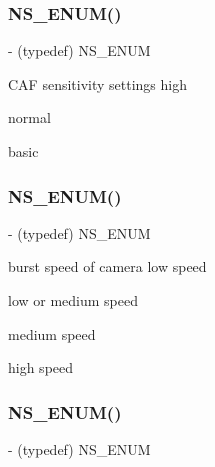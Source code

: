 \subsubsection{\texorpdfstring{N\+S\+\_\+\+E\+N\+U\+M()}{NS\_ENUM()}\hspace{0.1cm}{\footnotesize\ttfamily [5/17]}}
{\footnotesize\ttfamily -\/ (typedef) N\+S\+\_\+\+E\+N\+UM \begin{DoxyParamCaption}\item[{(N\+S\+U\+Integer)}]{ }\item[{(P\+V\+Eye\+Camera\+Video\+C\+A\+F\+Level)}]{ }\end{DoxyParamCaption}}

C\+AF sensitivity settings high

normal

basic\mbox{\label{interface_p_v_eye_camera_settings_def_a0a6912668cd8b13de829a5965efda1f7}} 
\subsubsection{\texorpdfstring{N\+S\+\_\+\+E\+N\+U\+M()}{NS\_ENUM()}\hspace{0.1cm}{\footnotesize\ttfamily [6/17]}}
{\footnotesize\ttfamily -\/ (typedef) N\+S\+\_\+\+E\+N\+UM \begin{DoxyParamCaption}\item[{(N\+S\+U\+Integer)}]{ }\item[{(P\+V\+Eye\+Camera\+Continuous\+Shoot\+Speed)}]{ }\end{DoxyParamCaption}}

burst speed of camera low speed

low or medium speed

medium speed

high speed\mbox{\label{interface_p_v_eye_camera_settings_def_a20cca0481c436c030b368d561ec560c2}} 
\subsubsection{\texorpdfstring{N\+S\+\_\+\+E\+N\+U\+M()}{NS\_ENUM()}\hspace{0.1cm}{\footnotesize\ttfamily [7/17]}}
{\footnotesize\ttfamily -\/ (typedef) N\+S\+\_\+\+E\+N\+UM \begin{DoxyParamCaption}\item[{(N\+S\+U\+Integer)}]{ }\item[{(P\+V\+Eye\+Camera\+Video\+Shutter\+Speed)}]{ }\end{DoxyParamCaption}}

